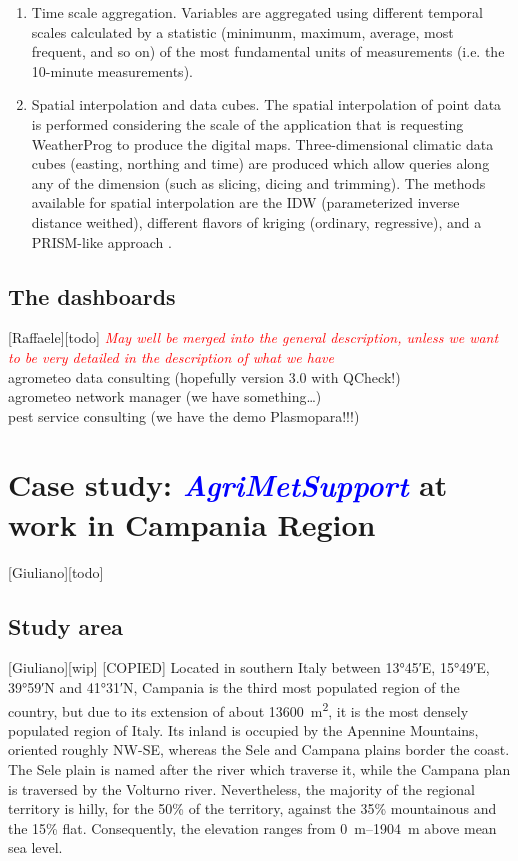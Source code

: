 \documentclass[authoryear,preprint,review,12pt]{elsarticle}
\newcommand{\note}[1]{\emph{\textcolor{red}{#1}}}
\newcommand{\update}[1]{\emph{\textcolor{blue}{#1}}}
\newcommand{\gci}{\update{AgriMetSupport}\xspace}
\begin{document}
\begin{enumerate}
    \item Time scale aggregation. Variables are aggregated using different temporal scales calculated by a statistic (minimunm, maximum, average, most frequent, and so on) of the most fundamental units of measurements (i.e. the 10-minute  measurements).
    
    \item Spatial interpolation and data cubes. The spatial interpolation of point data is performed considering the scale of the application that is requesting WeatherProg to produce the digital maps.
    Three-dimensional climatic data cubes (easting, northing and time) are produced which allow queries along any of the dimension (such as slicing, dicing and trimming). The methods available for spatial interpolation are the IDW (parameterized inverse distance weithed), different flavors of kriging (ordinary, regressive), and a PRISM-like approach \citep{Daly08_PRISM_USA}.
\end{enumerate}

\subsection{The dashboards}[Raffaele][todo]
\note{May well be merged into the general description, unless we want to be very detailed in the description of what we have}\\
agrometeo data consulting (hopefully version 3.0 with QCheck!)\\
agrometeo network manager (we have something\ldots)\\
pest service consulting (we have the demo Plasmopara!!!)\\

\section{Case study: \gci at work in Campania Region}[Giuliano][todo]

\subsection{Study area}[Giuliano][wip]
[COPIED] Located in southern Italy between \ang{13;45;}E, \ang{15;49;}E, \ang{39;59;}N and \ang{41;31;}N, Campania is the third most populated region of the country, but due to its extension of about \SI{13600}{\metre\squared}, it is the most densely populated region of Italy.
Its inland is occupied by the Apennine Mountains, oriented roughly NW-SE, whereas the Sele and Campana plains border the coast.
The Sele plain is named after the river which traverse it, while the Campana plan is traversed by the Volturno river.
Nevertheless, the majority of the regional territory is hilly, for the 50\% of the territory, against the 35\% mountainous and the 15\% flat.
Consequently, the elevation ranges from \SIrange{0}{1904}{\metre} above mean sea level.
\end{document}
